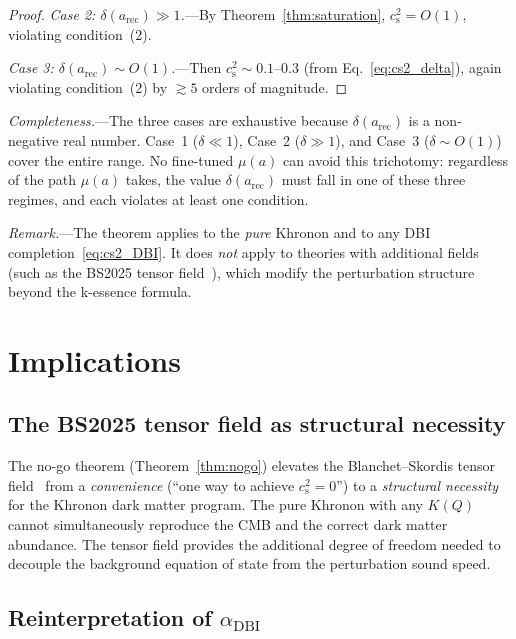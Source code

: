 \documentclass[prd,twocolumn,superscriptaddress,longbibliography,floatfix]{revtex4-2}
\newcommand{\cs}{c_{\mathrm{s}}}
\begin{document}
\begin{proof}
\emph{Case 2: $\delta(a_{\mathrm{rec}}) \gg 1$.}---By
Theorem~\ref{thm:saturation}, $\cs^2 = O(1)$, violating
condition~(2).

\emph{Case 3: $\delta(a_{\mathrm{rec}}) \sim O(1)$.}---Then
$\cs^2 \sim 0.1$--$0.3$ (from Eq.~\ref{eq:cs2_delta}),
again violating condition~(2) by $\gtrsim 5$ orders of
magnitude.
\end{proof}

\emph{Completeness.}---The three cases are exhaustive because
$\delta(a_{\mathrm{rec}})$ is a non-negative real number.
Case~1 ($\delta \ll 1$), Case~2 ($\delta \gg 1$), and Case~3
($\delta \sim O(1)$) cover the entire range.  No fine-tuned
$\mu(a)$ can avoid this trichotomy: regardless of the path
$\mu(a)$ takes, the value $\delta(a_{\mathrm{rec}})$ must fall
in one of these three regimes, and each violates at least one
condition.

\emph{Remark.}---The theorem applies to the \emph{pure}
Khronon and to any DBI completion~\eqref{eq:cs2_DBI}.
It does \emph{not} apply to theories with additional
fields (such as the BS2025 tensor
field~\cite{BS2025}), which modify the perturbation
structure beyond the k-essence formula.


\section{Implications}
\label{sec:implications}

\subsection{The BS2025 tensor field as structural necessity}

The no-go theorem (Theorem~\ref{thm:nogo}) elevates the
Blanchet--Skordis tensor field~\cite{BS2025} from a
\emph{convenience} (``one way to achieve $\cs^2 = 0$'')
to a \emph{structural necessity} for the Khronon dark
matter program.  The pure Khronon with any $K(Q)$ cannot
simultaneously reproduce the CMB and the correct dark
matter abundance.  The tensor field provides the additional
degree of freedom needed to decouple the background
equation of state from the perturbation sound speed.

\subsection{Reinterpretation of $\alpha_{\mathrm{DBI}}$}
\end{document}
